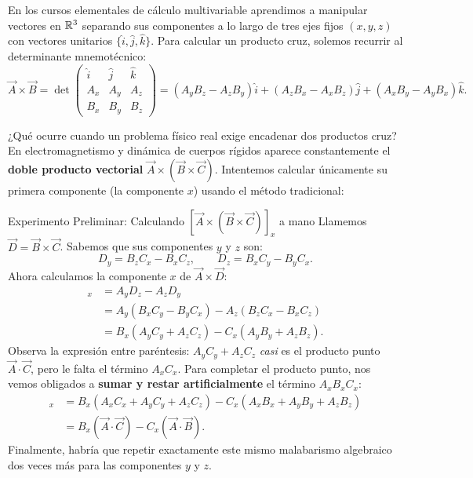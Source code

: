 \documentclass[11pt,letterpaper]{article}
\begin{document}
\setlength{\abovedisplayskip}{6pt}
\setlength{\belowdisplayskip}{6pt}
\setlength{\textfloatsep}{10pt}
\setlength{\intextsep}{8pt}
\color{blackmain}



En los cursos elementales de cálculo multivariable aprendimos a manipular vectores en $\mathbb{R}^3$ separando sus componentes a lo largo de tres ejes fijos $(x, y, z)$ con vectores unitarios $\{\hat{i}, \hat{j}, \hat{k}\}$. Para calcular un producto cruz, solemos recurrir al determinante mnemotécnico:
\[
\vec{A} \times \vec{B} = \det \begin{pmatrix} \hat{i} & \hat{j} & \hat{k} \\ A_x & A_y & A_z \\ B_x & B_y & B_z \end{pmatrix}
= (A_y B_z - A_z B_y)\hat{i} + (A_z B_x - A_x B_z)\hat{j} + (A_x B_y - A_y B_x)\hat{k}.
\]

¿Qué ocurre cuando un problema físico real exige encadenar dos productos cruz? En electromagnetismo y dinámica de cuerpos rígidos aparece constantemente el \textbf{doble producto vectorial} $\vec{A} \times (\vec{B} \times \vec{C})$. Intentemos calcular únicamente su primera componente (la componente $x$) usando el método tradicional:

\begin{examplebox}{Experimento Preliminar: Calculando $[\vec{A}\times(\vec{B}\times\vec{C})]_x$ a mano}
Llamemos $\vec{D} = \vec{B} \times \vec{C}$. Sabemos que sus componentes $y$ y $z$ son:
\[
D_y = B_z C_x - B_x C_z, \qquad D_z = B_x C_y - B_y C_x.
\]
Ahora calculamos la componente $x$ de $\vec{A} \times \vec{D}$:
\begin{align*}
[\vec{A} \times (\vec{B} \times \vec{C})]_x &= A_y D_z - A_z D_y \\
&= A_y(B_x C_y - B_y C_x) - A_z(B_z C_x - B_x C_z) \\
&= B_x(A_y C_y + A_z C_z) - C_x(A_y B_y + A_z B_z).
\end{align*}
Observa la expresión entre paréntesis: $A_y C_y + A_z C_z$ \textit{casi} es el producto punto $\vec{A}\cdot\vec{C}$, pero le falta el término $A_x C_x$. Para completar el producto punto, nos vemos obligados a \textbf{sumar y restar artificialmente} el término $A_x B_x C_x$:
\begin{align*}
[\vec{A} \times (\vec{B} \times \vec{C})]_x &= B_x(A_x C_x + A_y C_y + A_z C_z) - C_x(A_x B_x + A_y B_y + A_z B_z) \\
&= B_x(\vec{A}\cdot\vec{C}) - C_x(\vec{A}\cdot\vec{B}).
\end{align*}
Finalmente, habría que repetir exactamente este mismo malabarismo algebraico dos veces más para las componentes $y$ y $z$.
\end{examplebox}
\end{document}
